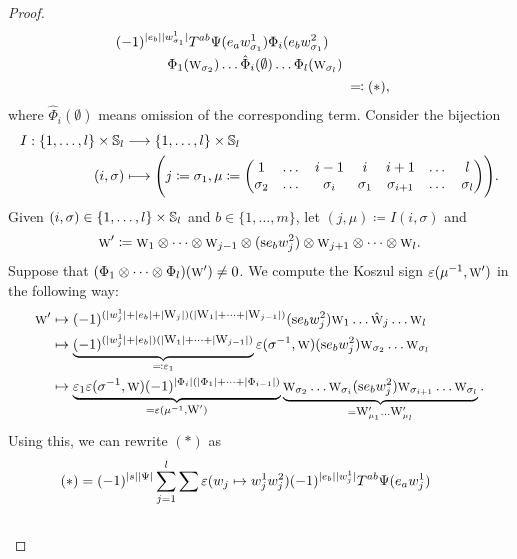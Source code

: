 \documentclass[\MainFolder/Text.tex]{subfiles}
\begin{document}
\begin{proof}
\begin{align*}
\begin{multlined}[t]
(-1)^{\Abs{e_b}\Abs{w_{\sigma_1}^1}}T^{ab} \Psi(e_a w_{\sigma_1}^1) \Phi_i(e_b w_{\sigma_1}^2) \\ \Phi_1(\W_{\sigma_2}) \dots \hat{\Phi}_i(\emptyset) \dots \Phi_l(\W_{\sigma_l})\end{multlined} \\
&\; \eqqcolon (*),
\end{align*}
where $\hat{\Phi}_i(\emptyset)$ means omission of the corresponding term. Consider the bijection 
$$\begin{aligned}
I: \{1,\dotsc, l\} \times \Perm_l &\longrightarrow \{1,\dotsc, l\} \times \Perm_l \\
(i,\sigma) &\longmapsto \Biggl(j\coloneqq \sigma_1,\mu\coloneqq \begin{pmatrix} 1 & \dots & i-1 & i & i+1 & \dots & l \\ \sigma_2 & \dots & \sigma_{i} & \sigma_1 & \sigma_{i+1} & \dots & \sigma_l \end{pmatrix}\Biggr).
\end{aligned}$$
Given $(i,\sigma) \in \{1,\dotsc,l\}\times \Perm_l$ and $b\in \{1,\dotsc,m\}$, let $(j,\mu)\coloneqq I(i,\sigma)$ and
$$ \W'\coloneqq \W_1 \otimes \dotsb \otimes \W_{j-1} \otimes (\Susp e_b w_{j}^2)\otimes \W_{j+1}  \otimes \dotsb \otimes \W_l. $$
Suppose that $(\Phi_1 \otimes \dotsb \otimes \Phi_l)(\W')\neq 0$. We compute the Koszul sign $\varepsilon(\mu^{-1},\W')$ in the following way:
$$ \begin{aligned}
\W' &\mapsto (-1)^{(\Abs{w_{j}^1} + \Abs{e_b} + \Abs{\W_j})(\Abs{\W_1} + \dotsb + \Abs{\W_{j-1}})} (\Susp e_b w_j^2)\W_1 \dots \hat{\W}_j \dots \W_l \\
 & \mapsto \underbrace{(-1)^{(\Abs{w_{j}^1} + \Abs{e_b})(\Abs{\W_1} + \dotsb + \Abs{\W_{j-1}})}}_{\eqqcolon\varepsilon_1}\varepsilon(\sigma^{-1},\W) (\Susp e_b w_j^2) \W_{\sigma_2} \dots \W_{\sigma_l} \\
& \mapsto \underbrace{\varepsilon_1 \varepsilon(\sigma^{-1},\W) (-1)^{\Abs{\Phi_i}(\Abs{\Phi_1} + \dotsb + \Abs{\Phi_{i-1}})}}_{=\varepsilon(\mu^{-1},\W')}  \underbrace{\W_{\sigma_2} \dots \W_{\sigma_{i}} (\Susp e_b w_j^2) \W_{\sigma_{i+1}}\dots\W_{\sigma_l}}_{=\W'_{\mu_1}\dots \W'_{\mu_l}}.
\end{aligned}$$
Using this, we can rewrite $(*)$ as
$$\begin{aligned}
(*) &= \begin{multlined}[t](-1)^{\Abs{s}\Abs{\Psi}}\sum_{j=1}^l \sum\varepsilon(w_j \mapsto w_j^1 w_j^2)(-1)^{\Abs{e_b}\Abs{w_j^1}}T^{ab} \Psi(e_a w_j^1)  \\ 

\end{multlined}
\end{aligned}$$
\end{proof}
\end{document}
